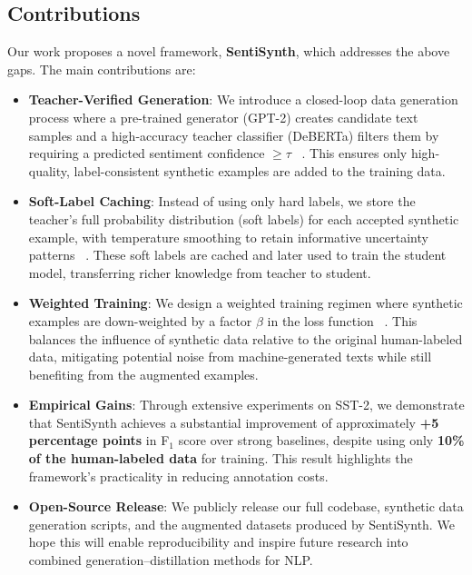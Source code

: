 \documentclass[11pt]{article}
\begin{document}
\subsection{Contributions}
Our work proposes a novel framework, \textbf{SentiSynth}, which
addresses the above gaps. The main contributions are:
\begin{itemize}
  \item \textbf{Teacher-Verified Generation}: We introduce a
    closed-loop data generation process where a pre-trained generator
    (GPT-2) creates candidate text samples and a high-accuracy
    teacher classifier (DeBERTa) filters them by requiring a
    predicted sentiment confidence $\ge \tau$ ~\cite{CITATION_NEEDED}. This
    ensures only high-quality, label-consistent synthetic examples
    are added to the training data.
  \item \textbf{Soft-Label Caching}: Instead of using only hard
    labels, we store the teacher's full probability distribution
    (soft labels) for each accepted synthetic example, with
    temperature smoothing to retain informative uncertainty patterns
    ~\cite{CITATION_NEEDED}. These soft labels are cached and later used to
    train the student model, transferring richer knowledge from
    teacher to student.
  \item \textbf{Weighted Training}: We design a weighted training
    regimen where synthetic examples are down-weighted by a factor
    $\beta$ in the loss function ~\cite{CITATION_NEEDED}. This balances the
    influence of synthetic data relative to the original
    human-labeled data, mitigating potential noise from
    machine-generated texts while still benefiting from the augmented examples.
  \item \textbf{Empirical Gains}: Through extensive experiments on
    SST-2, we demonstrate that SentiSynth achieves a substantial
    improvement of approximately \textbf{+5 percentage points} in
    F$_1$ score over strong baselines, despite using only
    \textbf{10\% of the human-labeled data} for training. This result
    highlights the framework's practicality in reducing annotation costs.
  \item \textbf{Open-Source Release}: We publicly release our full
    codebase, synthetic data generation scripts, and the augmented
    datasets produced by SentiSynth. We hope this will enable
    reproducibility and inspire future research into combined
    generation–distillation methods for NLP.
\end{itemize}
\end{document}
